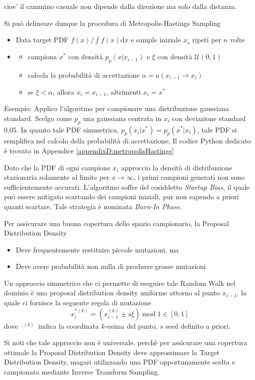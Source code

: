 cioe' il cammino casuale non dipende dalla direzione ma solo dalla distanza.\par
Si pu\`o delineare dunque la procedura di Metropolis-Hastings Sampling
\begin{itemize}[noitemsep,topsep=0pt]
	\item Data target PDF $f(x)/\int f(x)\mathrm{d}x$ e sample iniziale $x_o$ ripeti per $n$ volte
	\item[]\begin{itemize}[noitemsep,topsep=0pt]
		\item campiona $x^*$ con densit\`a $p_p(x|x_{i-1})$ e $\xi$ con densit\`a $\mathcal{U}(0,1)$
		\item calcola la probabilit\`a di accettazione $\alpha = a(x_{i-1}\to x_i)$
		\item se $\xi < \alpha$, allora $x_i = x_{i-1}$, altrimenti $x_i = x^*$
	\end{itemize}
\end{itemize}
Esempio: Applico l'algoritmo per campionare una distribuzione gaussiana standard. Scelgo come $p_p$ una gaussiana centrata in $x_i$ con 
deviazione standard $0.05$. In quanto tale PDF simmetrica, \mbox{$p_p(x_i|x^*)=p_p(x^*|x_i)$}, tale PDF si semplifica nel calcolo della probabilit\`a 
di accettazione. Il codice Python dedicato \`e trovato in Appendice \ref{appendixD:metropolisHastings}\par
Dato che la PDF di ogni campione $x_i$ approccia la densit\`a di distribuzione stazionaria solamente al limite per $x\to\infty$, i primi campioni
generati non sono sufficientemente accurati. L'algoritmo soffre del cosiddetto \textit{Startup Bias}, il quale pu\`o essere mitigato scartando 
dei campioni iniziali, pur non sapendo a priori quanti scartare. Tale strategia \`e nominata \textit{Burn-In Phase}.\par
Per assicurare una buona copertura dello spazio campionario, la Proposal Distribution Density
\begin{itemize}[topsep=0pt,noitemsep]
	\item Deve frequentemente restituire piccole mutazioni, ma
	\item Deve avere probabilit\`a non nulla di produrre grosse mutazioni\footnotemark{}
\end{itemize}
Un approccio simmetrico che ci permette di eseguire tale Random Walk nel dominio \`e una proposal distribution density uniforme attorno al punto 
$x_{i-1}$, la quale ci fornisce la seguente regola di mutazione
\begin{equation}
	x_i^{*(k)}=\left(x_{i-1}^{(k)}\pm s\xi\right)\operatorname{mod}1\in[0,1]
\end{equation}
dove $\cdot^{(k)}$ indica la coordinata $k$-esima del punto, $s$ seed definito a priori.\par
Si noti che tale approccio non \`e universale, perch\`e per assicurare una copertura ottimale la Proposal Distribution Density deve approssimare 
la Target Distribution Density, magari utilizzando una PDF opportunamente scelta e campionata mediante Inverse Transform Sampling.
